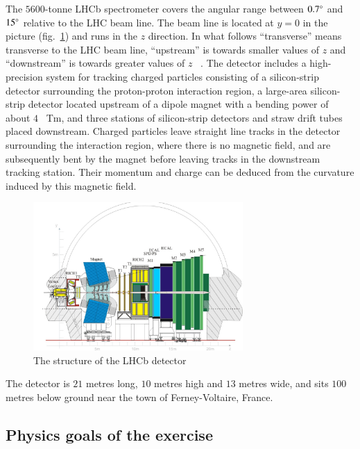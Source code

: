 \documentclass[3p,times,twocolumn]{elsarticle}
\begin{document}
The $5600$-tonne LHCb spectrometer covers the angular range between $0.7\degree$ and $15\degree$ relative to the LHC beam line. The beam line is located at $y = 0$ in the picture (fig.~\ref{aaa}) and runs in the $z$ direction. In what follows ``transverse'' means transverse to the LHC beam line, ``upstream'' is towards smaller values of $z$ and ``downstream'' is towards greater values of $z$ ~\cite{officialguide}. The detector includes a high-precision system for tracking charged particles consisting of a silicon-strip detector surrounding the proton-proton interaction region, a large-area silicon-strip detector located upstream of a dipole magnet with a bending power of about $4$ ~Tm, and three stations of silicon-strip detectors and straw drift tubes placed downstream. Charged particles leave straight line tracks in the detector surrounding the interaction region, where there is no magnetic field, and are subsequently bent by the magnet before leaving tracks in the downstream tracking station. Their momentum and charge can be deduced from the curvature induced by this magnetic field. \par

\begin{figure}[ht!]
	\centering
	\includegraphics[width=80mm]{5x0vbq.jpg}
	\caption{The structure of the LHCb detector \label{aaa}}
\end{figure}

The detector is $21$ metres long, $10$ metres high and $13$ metres wide, and sits $100$ metres below ground near the town of Ferney-Voltaire, France.

\subsection{Physics goals of the exercise}
\end{document}
